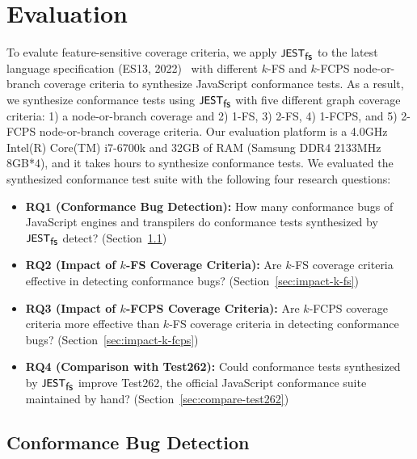 \section{Evaluation}\label{sec:eval}

To evalute feature-sensitive coverage criteria, we apply $\textsf{\small JEST}_{\textsf{\small fs}}$ to the latest
language specification (ES13, 2022)~\cite{es13} with different $k$-FS and
$k$-FCPS node-or-branch coverage criteria to synthesize JavaScript conformance
tests.
%
As a result, we synthesize  conformance tests using $\textsf{\small JEST}_{\textsf{\small fs}}$ with
five different graph coverage criteria: 1) a node-or-branch coverage and 2)
1-FS, 3) 2-FS, 4) 1-FCPS, and 5) 2-FCPS node-or-branch coverage criteria.
%
Our evaluation platform is a 4.0GHz Intel(R) Core(TM) i7-6700k and 32GB of RAM
(Samsung DDR4 2133MHz 8GB*4), and it takes  hours to synthesize
conformance tests.
%
We evaluated the synthesized conformance test suite with the following four
research questions:
\begin{itemize}
  \item \textbf{RQ1 (Conformance Bug Detection):} How many conformance bugs of
    JavaScript engines and transpilers do conformance tests synthesized by
    $\textsf{\small JEST}_{\textsf{\small fs}}$ detect? (Section~\ref{sec:conform-bug})
  \item \textbf{RQ2 (Impact of $k$-FS Coverage Criteria):} Are $k$-FS coverage
    criteria effective in detecting conformance bugs?
    (Section~\ref{sec:impact-k-fs})
  \item \textbf{RQ3 (Impact of $k$-FCPS Coverage Criteria):} Are $k$-FCPS
    coverage criteria more effective than $k$-FS coverage criteria in detecting
    conformance bugs? (Section~\ref{sec:impact-k-fcps})
  \item \textbf{RQ4 (Comparison with Test262):} Could conformance tests
    synthesized by $\textsf{\small JEST}_{\textsf{\small fs}}$ improve Test262, the official JavaScript conformance
    suite maintained by hand? (Section~\ref{sec:compare-test262})
\end{itemize}


\subsection{Conformance Bug Detection}\label{sec:conform-bug}

